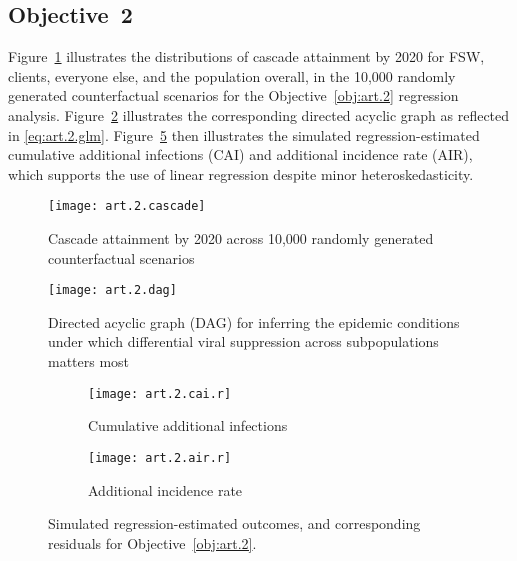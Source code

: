 \subsection{Objective~2}\label{sr.art.2}
Figure~\ref{fig:art.2.cascade} illustrates the distributions of cascade attainment by 2020
for FSW, clients, everyone else, and the population overall,
in the 10,000 randomly generated counterfactual scenarios
for the Objective~\ref{obj:art.2} regression analysis.
Figure~\ref{fig:art.2.dag} illustrates
the corresponding directed acyclic graph as reflected in \eqref{eq:art.2.glm}.
Figure~\ref{fig:art.2.r} then illustrates the simulated \vs regression-estimated
cumulative additional infections (CAI) and additional incidence rate (AIR),
which supports the use of linear regression
despite minor heteroskedasticity.
\begin{figure}[h]
  \centering
  \texttt{[image: art.2.cascade]}
  \caption{Cascade attainment by 2020 across 10,000 randomly generated counterfactual scenarios}
  \label{fig:art.2.cascade}
\end{figure}
\begin{figure}
  \centering\texttt{[image: art.2.dag]}
  \caption{Directed acyclic graph (DAG) for inferring
    the epidemic conditions under which
    differential viral suppression across subpopulations matters most}
  \label{fig:art.2.dag}
\end{figure}
\begin{figure}[h]
  \begin{subfigure}{.5\linewidth}
    \texttt{[image: art.2.cai.r]}
    \caption{Cumulative additional infections}
    \label{fig:art.2.cai.r}
  \end{subfigure}%
  \begin{subfigure}{.5\linewidth}
    \texttt{[image: art.2.air.r]}
    \caption{Additional incidence rate}
    \label{fig:art.2.air.r}
  \end{subfigure}
  \caption{Simulated \vs regression-estimated outcomes,
    and corresponding residuals for Objective~\ref{obj:art.2}.}
  \label{fig:art.2.r}
\end{figure}
